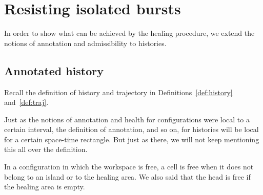 \documentclass[12pt]{memoir}
\begin{document}
\section{Resisting isolated bursts}
\label{sec:1-level-noise}

In order to show what can be achieved by the healing procedure,
we extend the notions of annotation and admissibility to histories.



\subsection{Annotated history}

Recall the definition of history and trajectory in Definitions~\ref{def:history} 
and~\ref{def:traj}.

Just as the notions of annotation and health for configurations were local to a certain
interval, the definition of annotation, and so on, for histories 
will be local for a certain space-time rectangle.
But just as there, we will not keep mentioning this all over the definition.

In a configuration in which the workspace is free, a cell is free when it does not
belong to an island or to the healing area.
We also said that the head is free if the healing area is empty.
\end{document}
